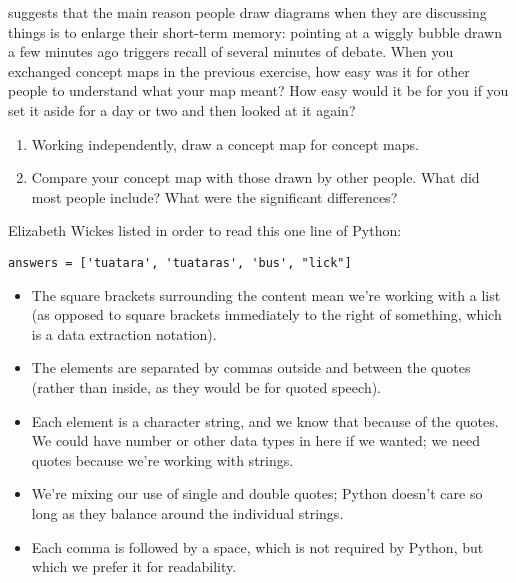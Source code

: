 
\cite{Cher2007} suggests that
the main reason people draw diagrams when they are discussing things
is to enlarge their short-term memory:
pointing at a wiggly bubble drawn a few minutes ago triggers recall of several minutes of debate.
When you exchanged concept maps in the previous exercise,
how easy was it for other people to understand what your map meant?
How easy would it be for you if you set it aside for a day or two and then looked at it again?


\begin{enumerate}

\item
  Working independently,
  draw a concept map for concept maps.

\item
  Compare your concept map with those drawn by other people.
  What did most people include?
  What were the significant differences?

\end{enumerate}


Elizabeth Wickes listed
in order to read this one line of Python:

\begin{verbatim}
answers = ['tuatara', 'tuataras', 'bus', "lick"]
\end{verbatim}

\begin{itemize}
\item
  The square brackets surrounding the content mean we're working with a list
  (as opposed to square brackets immediately to the right of something,
  which is a data extraction notation).
\item
  The elements are separated by commas outside and between the quotes
  (rather than inside, as they would be for quoted speech).
\item
  Each element is a character string,
  and we know that because of the quotes.
  We could have number or other data types in here if we wanted;
  we need quotes because we're working with strings.
\item
  We're mixing our use of single and double quotes;
  Python doesn't care so long as they balance around the individual strings.
\item
  Each comma is followed by a space,
  which is not required by Python,
  but which we prefer it for readability.
\end{itemize}

